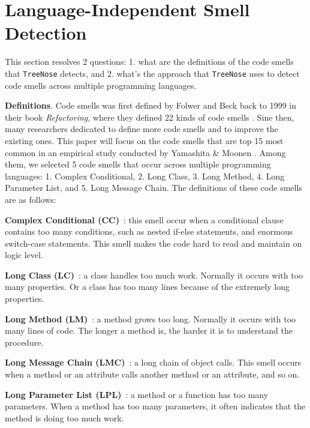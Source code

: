 

\vspace*{-0.5em}

\section{Language-Independent Smell Detection}

\vspace*{-0.1em}

This section resolves 2 questions: 1. what are the definitions of the code
smells that \texttt{TreeNose} detects, and 2. what's the approach that
\texttt{TreeNose} uses to detect code smells across multiple programming
languages.

{\bf Definitions}. Code smells was first defined by Folwer and Beck back to 1999
in their book \textit{Refactoring}, where they defined 22 kinds of code smells
\cite{Fowler_Beck}. Sine then, many researchers dedicated to define more code
smells and to improve the existing ones. This paper will focus on the code
smells that are top 15 most common in an empirical study conducted by Yamashita
\& Moonen \cite{developersCare}. Among them, we selected 5 code smells that
occur across multiple programming languages: 1. Complex Conditional, 2. Long
Class, 3. Long Method, 4. Long Parameter List, and 5. Long Message Chain. The
definitions of these code smells are as follows:

\textbf{Complex Conditional (CC)}~\cite{Fowler_Beck}: this smell occur when a
conditional clause contains too many conditions, such as nested if-else
statements, and enormous switch-case statements. This smell makes the code hard
to read and maintain on logic level.

\textbf{Long Class (LC)}~\cite{Fowler_Beck}: a class handles too much work.
Normally it occurs with too many properties. Or a class has too many lines
because of the extremely long properties.

\textbf{Long Method (LM)}~\cite{Fowler_Beck}: a method grows too long. Normally
it occurs with too many lines of code. The longer a method is, the harder it is
to understand the procedure.

\textbf{Long Message Chain (LMC)}~\cite{Fowler_Beck}: a long chain of object
calls. This smell occurs when a method or an attribute calls another method or
an attribute, and so on.

\textbf{Long Parameter List (LPL)}~\cite{Fowler_Beck}: a method or a function
has too many parameters. When a method has too many parameters, it often
indicates that the method is doing too much work.

